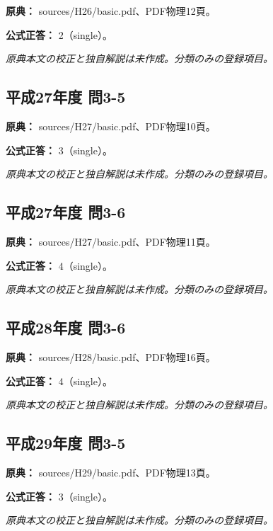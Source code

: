 \noindent\textbf{原典：} sources/H26/basic.pdf、PDF物理12頁。

\textbf{公式正答：} 2（single）。

\par\textit{原典本文の校正と独自解説は未作成。分類のみの登録項目。}

\subsection{平成27年度 問3-5}
\label{q:h27-reg-basic-3-5}

\noindent\textbf{原典：} sources/H27/basic.pdf、PDF物理10頁。

\textbf{公式正答：} 3（single）。

\par\textit{原典本文の校正と独自解説は未作成。分類のみの登録項目。}

\subsection{平成27年度 問3-6}
\label{q:h27-reg-basic-3-6}

\noindent\textbf{原典：} sources/H27/basic.pdf、PDF物理11頁。

\textbf{公式正答：} 4（single）。

\par\textit{原典本文の校正と独自解説は未作成。分類のみの登録項目。}

\subsection{平成28年度 問3-6}
\label{q:h28-reg-basic-3-6}

\noindent\textbf{原典：} sources/H28/basic.pdf、PDF物理16頁。

\textbf{公式正答：} 4（single）。

\par\textit{原典本文の校正と独自解説は未作成。分類のみの登録項目。}

\subsection{平成29年度 問3-5}
\label{q:h29-reg-basic-3-5}

\noindent\textbf{原典：} sources/H29/basic.pdf、PDF物理13頁。

\textbf{公式正答：} 3（single）。

\par\textit{原典本文の校正と独自解説は未作成。分類のみの登録項目。}

